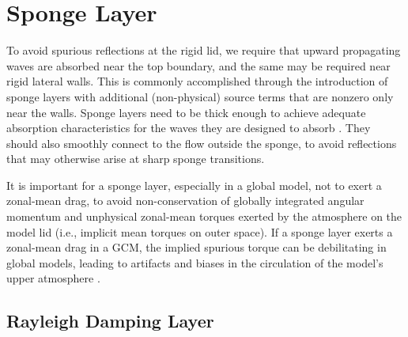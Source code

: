 \documentclass{report}
\begin{document}
\section{Sponge Layer}\label{s:sponge}

To avoid spurious reflections at the rigid lid, we require that upward propagating waves are absorbed near the top boundary, and the same may be required near rigid lateral walls. This is commonly accomplished through the introduction of sponge layers with additional (non-physical) source terms that are nonzero only near the walls. Sponge layers need to be thick enough to achieve adequate absorption characteristics for the waves they are designed to absorb \citep{durran:1983}. They should also smoothly connect to the flow outside the sponge, to avoid reflections that may otherwise arise at sharp sponge transitions. 

It is important for a sponge layer, especially in a global model, not to exert a zonal-mean drag, to avoid non-conservation of globally integrated angular momentum and unphysical zonal-mean torques exerted by the atmosphere on the model lid (i.e., implicit mean torques on outer space). If a sponge layer exerts a zonal-mean drag in a GCM, the implied spurious torque can be debilitating in global models, leading to artifacts and biases in the circulation of the model's upper atmosphere \citep[e.g.,][]{Shepherd96a}. 

\subsection{Rayleigh Damping Layer}
\end{document}
